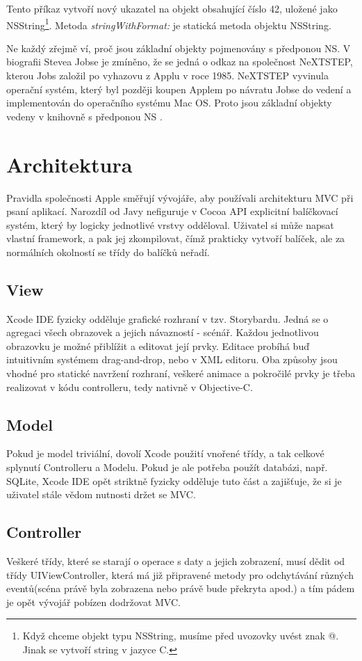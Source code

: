 Tento příkaz vytvoří nový ukazatel na objekt obsahující číslo 42, uložené jako NSString\footnote{Když chceme objekt typu NSString, musíme před uvozovky uvést znak @. Jinak se vytvoří string v jazyce C.\cite{OBJC}}. Metoda \emph{stringWithFormat:} je statická metoda objektu NSString.

Ne každý zřejmě ví, proč jsou základní objekty pojmenovány s předponou NS. V biografii Stevea Jobse \cite{STEVE} je zmíněno, že se jedná o odkaz na společnost NeXTSTEP, kterou Jobs založil po vyhazovu z Applu v roce 1985. NeXTSTEP vyvinula operační systém, který byl později koupen Applem po návratu Jobse do vedení a implementován do operačního systému Mac OS. Proto jsou základní objekty vedeny v knihovně s předponou NS \cite{NeXTSTEP}.

\section{Architektura}
Pravidla společnosti Apple směřují vývojáře, aby používali architekturu MVC při psaní aplikací. Narozdíl od Javy nefiguruje v Cocoa API explicitní balíčkovací systém, který by logicky jednotlivé vrstvy odděloval. Uživatel si může napsat vlastní framework, a pak jej zkompilovat, čímž prakticky vytvoří balíček, ale za normálních okolností se třídy do balíčků neřadí.

\subsection*{View}
Xcode IDE fyzicky odděluje grafické rozhraní v tzv. Storybardu. Jedná se o agregaci všech obrazovek a jejich návazností - scénář. Každou jednotlivou obrazovku je možné přiblížit a editovat její prvky. Editace probíhá buď intuitivním systémem drag-and-drop, nebo v XML editoru. Oba způsoby jsou vhodné pro statické navržení rozhraní, veškeré animace a pokročilé prvky je třeba realizovat v kódu controlleru, tedy nativně v Objective-C.

\subsection*{Model}
Pokud je model triviální, dovolí Xcode použití vnořené třídy, a tak celkové splynutí Controlleru a Modelu. Pokud je ale potřeba použít databázi, např. SQLite, Xcode IDE opět striktně fyzicky odděluje tuto část a zajišťuje, že si je uživatel stále vědom nutnosti držet se MVC.

\subsection*{Controller}
Veškeré třídy, které se starají o operace s daty a jejich zobrazení, musí dědit od třídy UIViewController, která má již připravené metody pro odchytávání různých eventů(scéna právě byla zobrazena nebo právě bude překryta apod.) a tím pádem je opět vývojář pobízen dodržovat MVC.

